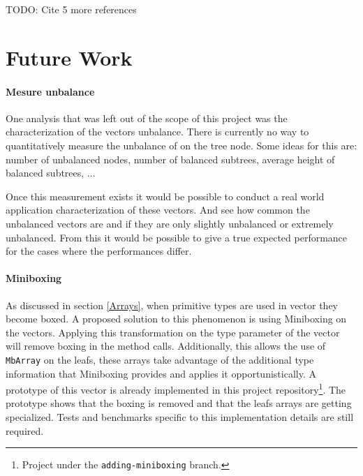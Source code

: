 \color{red} TODO: Cite 5 more references \color{black}



\section{Future Work}

\paragraph{Mesure unbalance}
One analysis that was left out of the scope of this project was the characterization of the vectors unbalance. There is currently no way to quantitatively measure the unbalance of on the tree node. Some ideas for this are: number of unbalanced nodes, number of balanced subtrees, average height of balanced subtrees, ... 

Once this measurement exists it would be possible to conduct a real world application characterization of these vectors. And see how common the unbalanced vectors are and if they are only slightly unbalanced or extremely unbalanced. From this it would be possible to give a true expected performance for the cases where the performances differ.

\paragraph{Miniboxing}
As discussed in section \ref{Arrays}, when primitive types are used in vector they become boxed. A proposed solution to this phenomenon is using Miniboxing \cite{Ureche:2013:MIS:2509136.2509537} on the vectors. Applying this transformation on the type parameter of the vector will remove boxing in the method calls. Additionally, this allows the use of \texttt{MbArray} on the leafs, these arrays take advantage of the additional type information that Miniboxing provides and applies it opportunistically. A prototype of this vector is already implemented in this project repository\footnote{Project \cite{projecRepo} under the \texttt{adding-miniboxing} branch.}. The prototype shows that the boxing is removed and that the leafs arrays are getting specialized. Tests and benchmarks specific to this implementation details are still required.


